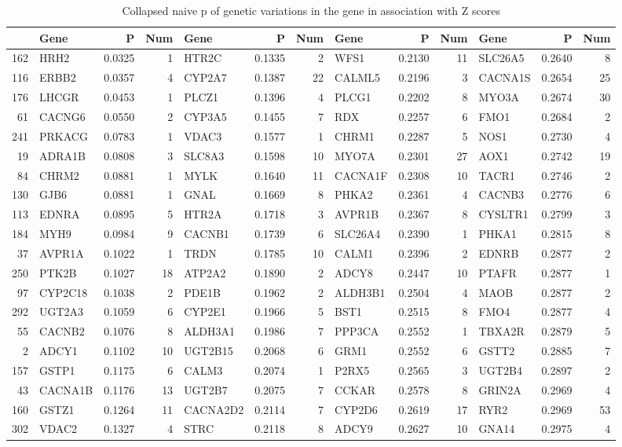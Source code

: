\documentclass{article}
\begin{document}
\begin{table}[tbp]
\centering
\caption{Collapsed naive p of genetic variations in the gene in association with Z scores} 
\label{tab:lowP}
{\tiny
\begin{tabular}{rlrrlrrlrrlrr}
  \hline
 & Gene & P & Num & Gene & P & Num & Gene & P & Num & Gene & P & Num \\ 
  \hline
162 & HRH2 & 0.0325 & 1 & HTR2C & 0.1335 & 2 & WFS1 & 0.2130 & 11 & SLC26A5 & 0.2640 & 8 \\ 
  116 & ERBB2 & 0.0357 & 4 & CYP2A7 & 0.1387 & 22 & CALML5 & 0.2196 & 3 & CACNA1S & 0.2654 & 25 \\ 
  176 & LHCGR & 0.0453 & 1 & PLCZ1 & 0.1396 & 4 & PLCG1 & 0.2202 & 8 & MYO3A & 0.2674 & 30 \\ 
  61 & CACNG6 & 0.0550 & 2 & CYP3A5 & 0.1455 & 7 & RDX & 0.2257 & 6 & FMO1 & 0.2684 & 2 \\ 
  241 & PRKACG & 0.0783 & 1 & VDAC3 & 0.1577 & 1 & CHRM1 & 0.2287 & 5 & NOS1 & 0.2730 & 4 \\ 
  19 & ADRA1B & 0.0808 & 3 & SLC8A3 & 0.1598 & 10 & MYO7A & 0.2301 & 27 & AOX1 & 0.2742 & 19 \\ 
  84 & CHRM2 & 0.0881 & 1 & MYLK & 0.1640 & 11 & CACNA1F & 0.2308 & 10 & TACR1 & 0.2746 & 2 \\ 
  130 & GJB6 & 0.0881 & 1 & GNAL & 0.1669 & 8 & PHKA2 & 0.2361 & 4 & CACNB3 & 0.2776 & 6 \\ 
  113 & EDNRA & 0.0895 & 5 & HTR2A & 0.1718 & 3 & AVPR1B & 0.2367 & 8 & CYSLTR1 & 0.2799 & 3 \\ 
  184 & MYH9 & 0.0984 & 9 & CACNB1 & 0.1739 & 6 & SLC26A4 & 0.2390 & 1 & PHKA1 & 0.2815 & 8 \\ 
  37 & AVPR1A & 0.1022 & 1 & TRDN & 0.1785 & 10 & CALM1 & 0.2396 & 2 & EDNRB & 0.2877 & 2 \\ 
  250 & PTK2B & 0.1027 & 18 & ATP2A2 & 0.1890 & 2 & ADCY8 & 0.2447 & 10 & PTAFR & 0.2877 & 1 \\ 
  97 & CYP2C18 & 0.1038 & 2 & PDE1B & 0.1962 & 2 & ALDH3B1 & 0.2504 & 4 & MAOB & 0.2877 & 2 \\ 
  292 & UGT2A3 & 0.1059 & 6 & CYP2E1 & 0.1966 & 5 & BST1 & 0.2515 & 8 & FMO4 & 0.2877 & 4 \\ 
  55 & CACNB2 & 0.1076 & 8 & ALDH3A1 & 0.1986 & 7 & PPP3CA & 0.2552 & 1 & TBXA2R & 0.2879 & 5 \\ 
  2 & ADCY1 & 0.1102 & 10 & UGT2B15 & 0.2068 & 6 & GRM1 & 0.2552 & 6 & GSTT2 & 0.2885 & 7 \\ 
  157 & GSTP1 & 0.1175 & 6 & CALM3 & 0.2074 & 1 & P2RX5 & 0.2565 & 3 & UGT2B4 & 0.2897 & 2 \\ 
  43 & CACNA1B & 0.1176 & 13 & UGT2B7 & 0.2075 & 7 & CCKAR & 0.2578 & 8 & GRIN2A & 0.2969 & 4 \\ 
  160 & GSTZ1 & 0.1264 & 11 & CACNA2D2 & 0.2114 & 7 & CYP2D6 & 0.2619 & 17 & RYR2 & 0.2969 & 53 \\ 
  302 & VDAC2 & 0.1327 & 4 & STRC & 0.2118 & 8 & ADCY9 & 0.2627 & 10 & GNA14 & 0.2975 & 4 \\ 
   \hline
\end{tabular}
}
\end{table}
\end{document}
